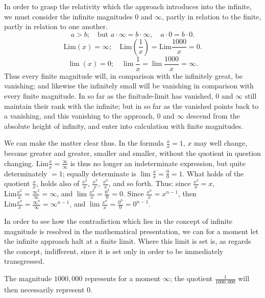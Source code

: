 \documentclass[12pt]{book}
\begin{document}
In order to grasp the relativity which the approach introduces into the infinite, we
must consider the infinite magnitudes $0$ and $\infty$, partly in relation to the
finite, partly in relation to one another.
\[
a > b; \quad \text{but } a\cdot\infty = b\cdot\infty, \quad a\cdot 0 = b\cdot 0.
\]
\[
\mathrm{Lim}(x) = \infty; \quad \mathrm{Lim}\left(\frac{1}{x}\right)
= \mathrm{Lim}\frac{1000}{x} = 0.
\]
\[
\lim(x) = 0; \quad \lim\frac{1}{x} = \lim\frac{1000}{x} = \infty.
\]
Thus every finite magnitude will, in comparison with the infinitely great, be
vanishing; and likewise the infinitely small will be vanishing in comparison with
every finite magnitude. In so far as the finitude-limit has vanished, $0$ and
$\infty$ still maintain their rank with the infinite; but in so far as the vanished
points back to a vanishing, and this vanishing to the approach, $0$ and $\infty$
descend from the absolute height of infinity, and enter into calculation with finite
magnitudes.

We can make the matter clear thus. In the formula $\frac{x}{x} = 1$, $x$ may well
change, become greater and greater, smaller and smaller, without the quotient in
question changing. $\mathrm{Lim}\frac{x}{x} = \frac{\infty}{\infty}$ is thus no
longer an indeterminate expression, but quite determinately $= 1$; equally
determinate is $\lim\frac{x}{x} = \frac{0}{0} = 1$. What holds of the quotient
$\frac{x}{x}$,
holds also of $\frac{x^{2}}{x}$, $\frac{x^{3}}{x}$, $\frac{x^{n}}{x}$, and so
forth. Thus: since $\frac{x^{2}}{x} = x$, $\mathrm{Lim}\frac{x^{2}}{x} =
\frac{\infty^{2}}{\infty} = \infty$, and $\lim\frac{x^{2}}{x} = \frac{0^{2}}{0}
= 0$. Since $\frac{x^{n}}{x} = x^{n-1}$, then $\mathrm{Lim}\frac{x^{n}}{x} =
\frac{\infty^{n}}{\infty} = \infty^{n-1}$, and $\lim\frac{x^{n}}{x} =
\frac{0^{n}}{0} = 0^{n-1}$.

In order to see how the contradiction which lies in the concept of infinite
magnitude is resolved in the mathematical presentation, we can for a moment let the
infinite approach halt at a finite limit. Where this
limit is set is, as regards the concept, indifferent, since it is set only in order
to be immediately transgressed.

The magnitude $1000{,}000$ represents for a moment $\infty$; the quotient
$\frac{1}{1000{,}000}$ will then necessarily represent $0$.
\end{document}
